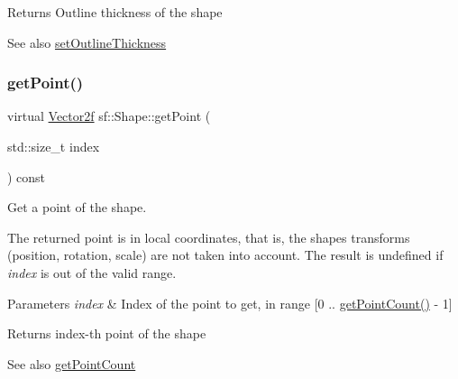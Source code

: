\begin{DoxyReturn}{Returns}
Outline thickness of the shape
\end{DoxyReturn}
\begin{DoxySeeAlso}{See also}
\mbox{\hyperlink{classsf_1_1_shape_a5ad336ad74fc1f567fce3b7e44cf87dc}{set\+Outline\+Thickness}} \begin{DoxyVerb}\end{DoxyVerb}
 
\end{DoxySeeAlso}
\mbox{\label{classsf_1_1_shape_a40e5d83713eb9f0c999944cf96458085}} 
\subsubsection{\texorpdfstring{getPoint()}{getPoint()}}
{\footnotesize\ttfamily virtual \mbox{\hyperlink{classsf_1_1_vector2}{Vector2f}} sf\+::\+Shape\+::get\+Point (\begin{DoxyParamCaption}\item[{std\+::size\+\_\+t}]{index }\end{DoxyParamCaption}) const\hspace{0.3cm}{\ttfamily [pure virtual]}}



Get a point of the shape. 

The returned point is in local coordinates, that is, the shape\textquotesingle{}s transforms (position, rotation, scale) are not taken into account. The result is undefined if {\itshape index} is out of the valid range.


\begin{DoxyParams}{Parameters}
{\em index} & Index of the point to get, in range \mbox{[}0 .. \mbox{\hyperlink{classsf_1_1_shape_af988dd61a29803fc04d02198e44b5643}{get\+Point\+Count()}} -\/ 1\mbox{]}\\
\hline
\end{DoxyParams}
\begin{DoxyReturn}{Returns}
index-\/th point of the shape
\end{DoxyReturn}
\begin{DoxySeeAlso}{See also}
\mbox{\hyperlink{classsf_1_1_shape_af988dd61a29803fc04d02198e44b5643}{get\+Point\+Count}} \begin{DoxyVerb}\end{DoxyVerb}
 
\end{DoxySeeAlso}


